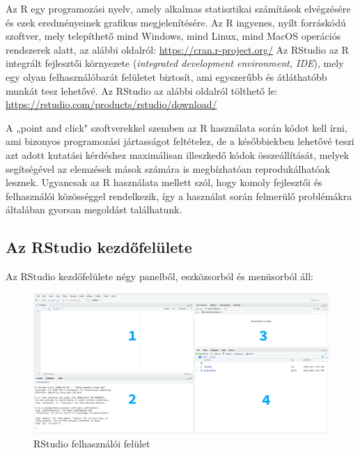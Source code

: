\documentclass[
]{book}
\begin{document}
Az R egy programozási nyelv, amely alkalmas statisztikai számítások
elvégzésére és ezek eredményeinek grafikus megjelenítésére. Az R
ingyenes, nyílt forráskódú szoftver, mely telepíthető mind Windows, mind
Linux, mind MacOS operációs rendszerek alatt, az alábbi oldalról:
\url{https://cran.r-project.org/} Az RStudio az R integrált fejlesztői
környezete (\emph{integrated development environment, IDE}), mely egy
olyan felhasználóbarát felületet biztosít, ami egyszerűbb és átláthatóbb
munkát tesz lehetővé. Az RStudio az alábbi oldalról tölthető le:
\url{https://rstudio.com/products/rstudio/download/}

A „point and click" szoftverekkel szemben az R használata során kódot
kell írni, ami bizonyos programozási jártasságot feltételez, de a
későbbiekben lehetővé teszi azt adott kutatási kérdéshez maximálisan
illeszkedő kódok összeállítását, melyek segítségével az elemzések mások
számára is megbízhatóan reprodukálhatóak lesznek. Ugyancsak az R
használata mellett szól, hogy komoly fejlesztői és felhasználói
közösséggel rendelkezik, így a használat során felmerülő problémákra
általában gyorsan megoldást találhatunk.

\hypertarget{az-rstudio-kezdux151feluxfclete}{%
\subsection{Az RStudio
kezdőfelülete}\label{az-rstudio-kezdux151feluxfclete}}

Az RStudio kezdőfelülete négy panelből, eszközsorból és menüsorból áll:

\begin{figure}

{\centering \includegraphics[width=0.9\linewidth]{figures/13-01_layout} 

}

\caption{RStudio felhasználói felület}\label{fig:unnamed-chunk-44}
\end{figure}
\end{document}
